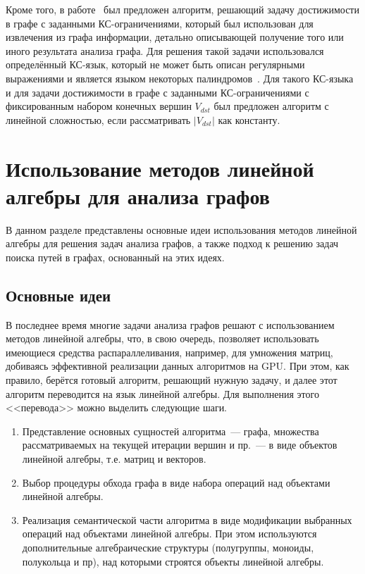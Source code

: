 Кроме того, в работе~\cite{miao2019understanding} был предложен алгоритм, решающий задачу достижимости в графе с заданными КС-ограничениями, который был использован для извлечения из графа информации, детально описывающей получение того или иного результата анализа графа. Для решения такой задачи использовался определённый КС-язык, который не может быть описан регулярными выражениями и является языком некоторых палиндромов~\cite{hopcroft2001introduction}. Для такого КС-языка и для задачи достижимости в графе с заданными КС-ограничениями с фиксированным набором конечных вершин $V_{dst}$ был предложен алгоритм с линейной сложностью, если рассматривать $|V_{dst}|$ как константу.

\section{Использование методов линейной алгебры для анализа графов}\label{sec:ch1/sec6}
В данном разделе представлены основные идеи использования методов линейной алгебры для решения задач анализа графов, а также подход к решению задач поиска путей в графах, основанный на этих идеях.

\subsection{Основные идеи}
В последнее время многие задачи анализа графов решают с использованием методов линейной алгебры, что, в свою очередь, позволяет использовать имеющиеся средства распараллеливания, например, для умножения матриц, добиваясь эффективной реализации данных алгоритмов на GPU. При этом, как правило, берётся готовый алгоритм, решающий нужную задачу, и далее этот алгоритм переводится на язык линейной алгебры. Для выполнения этого <<перевода>> можно выделить следующие шаги. 

\begin{enumerate}
    \item Представление основных сущностей алгоритма~--- графа, множества рассматриваемых на текущей итерации вершин и пр.~--- в виде объектов линейной алгебры, т.е. матриц и векторов. 
    \item Выбор процедуры обхода графа в виде набора операций над объектами линейной алгебры.
    \item Реализация семантической части алгоритма в виде модификации выбранных операций над объектами линейной алгебры. При этом используются дополнительные алгебраические структуры (полугруппы, моноиды, полукольца и пр), над которыми строятся объекты линейной алгебры.
\end{enumerate}

